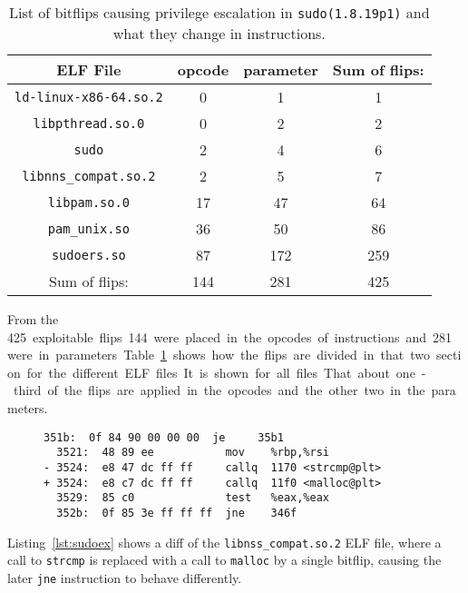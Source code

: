 \begin{table}[!htb]
\centering
\begin{tabular}{c|cc|c}
ELF File & opcode & parameter & Sum of flips: \\ \hline
\texttt{ld-linux-x86-64.so.2} & 0 & 1  & 1    \\
\texttt{libpthread.so.0}      & 0 & 2  & 2    \\
\texttt{sudo}                 & 2 & 4  & 6    \\
\texttt{libnns\_compat.so.2}  & 2 & 5  & 7    \\
\texttt{libpam.so.0}          & 17 & 47   & 64   \\
\texttt{pam\_unix.so}         & 36 & 50   & 86   \\
\texttt{sudoers.so}           & 87 & 172  & 259  \\ \hline
Sum of flips:                 & 144 & 281 & 425
\end{tabular}
\caption{List of bitflips causing privilege escalation in
\texttt{sudo(1.8.19p1)} and what they change in instructions.}
\label{tab:sudoflip}
\end{table}

From the \SI{425} exploitable flips \SI{144} were placed in the opcodes of
instructions and \SI{281} were in parameters. Table~\ref{tab:sudoflip} shows how
the flips are divided in that two section for the different ELF files. It is
shown for all files. That about one-third of the flips are applied in the
opcodes and the other two in the parameters.

\begin{figure}
\begin{minipage}{\linewidth}
\begin{lstlisting}[style=diff,
                   caption={Diff for a bitflip applied to
\texttt{libnss\_compat.so.2} in order to bypass a user privilege check. The call
to \texttt{strcmp} is exchanged because the offset used for the lookuptable
is flipped.},
label=lst:sudoex]
  351b:  0f 84 90 00 00 00  je     35b1
  3521:  48 89 ee           mov    %rbp,%rsi
- 3524:  e8 47 dc ff ff     callq  1170 <strcmp@plt>
+ 3524:  e8 c7 dc ff ff     callq  11f0 <malloc@plt>
  3529:  85 c0              test   %eax,%eax
  352b:  0f 85 3e ff ff ff  jne    346f
\end{lstlisting}
\end{minipage}
\end{figure}

Listing~\ref{lst:sudoex} shows a diff of the \texttt{libnss\_compat.so.2} ELF
file, where a call to \texttt{strcmp} is replaced with a call to \texttt{malloc}
by a single bitflip, causing the later \texttt{jne} instruction to behave
differently.

